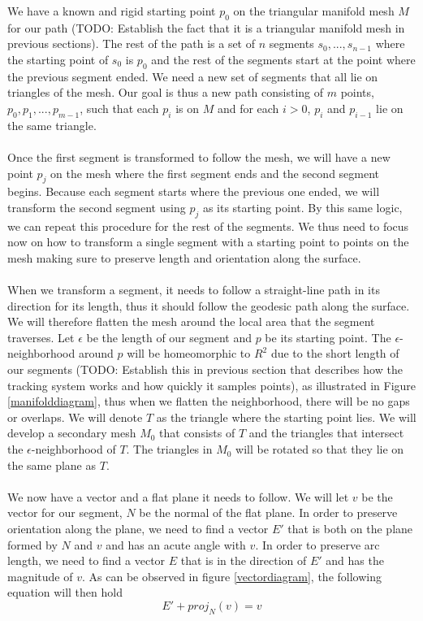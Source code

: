 We have a known and rigid starting point $p_0$ on the triangular manifold mesh $M$ for our path (TODO: Establish the fact that it is a triangular manifold mesh in previous sections). The rest of the path is a set of $n$ segments $s_0,...,s_{n-1}$ where the starting point of $s_0$ is $p_0$ and the rest of the segments start at the point where the previous segment ended. We need a new set of segments that all lie on triangles of the mesh. Our goal is thus a new path consisting of $m$ points, $p_0, p_1,...,p_{m-1}$, such that each $p_i$ is on $M$ and for each $i>0$, $p_{i}$ and $p_{i-1}$ lie on the same triangle. \\
\\
Once the first segment is transformed to follow the mesh, we will have a new point $p_j$ on the mesh where the first segment ends and the second segment begins. Because each segment starts where the previous one ended, we will transform the second segment using $p_j$ as its starting point. By this same logic, we can repeat this procedure for the rest of the segments. We thus need to focus now on how to transform a single segment with a starting point to points on the mesh making sure to preserve length and orientation along the surface. \\
\\
When we transform a segment, it needs to follow a straight-line path in its direction for its length, thus it should follow the geodesic path along the surface. We will therefore flatten the mesh around the local area that the segment traverses. Let $\epsilon$ be the length of our segment and $p$ be its starting point. The $\epsilon$-neighborhood around $p$ will be homeomorphic to $R^2$ due to the short length of our segments (TODO: Establish this in previous section that describes how the tracking system works and how quickly it samples points), as illustrated in Figure \ref{manifolddiagram}, thus when we flatten the neighborhood, there will be no gaps or overlaps. We will denote $T$ as the triangle where the starting point lies. We will develop a secondary mesh $M_0$ that consists of $T$ and the triangles that intersect the $\epsilon$-neighborhood of $T$. The triangles in $M_0$ will be rotated so that they lie on the same plane as $T$. \\
\\
We now have a vector and a flat plane it needs to follow. We will let $v$ be the vector for our segment, $N$ be the normal of the flat plane. In order to preserve orientation along the plane, we need to find a vector $E'$ that is both on the plane formed by $N$ and $v$ and has an acute angle with $v$. In order to preserve arc length, we need to find a vector $E$ that is in the direction of $E'$ and has the magnitude of $v$. As can be observed in figure \ref{vectordiagram}, the following equation will then hold
\[
E' + proj_N(v) = v
\]

